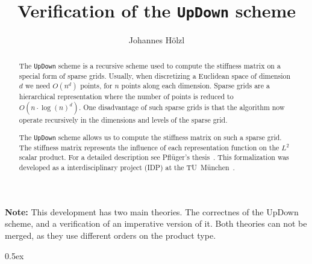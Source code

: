 \documentclass[11pt,a4paper]{article}
\title{Verification of the \texttt{UpDown} scheme}
\author{Johannes H{\"o}lzl}
\begin{document}
\maketitle

\begin{abstract}

The \texttt{UpDown} scheme is a recursive scheme used to compute the stiffness matrix on a special form of
sparse grids. Usually, when discretizing a Euclidean space of dimension $d$ we need $O(n^d)$ points,
for $n$ points along each dimension. Sparse grids are a hierarchical representation where the number
of points is reduced to $O(n\cdot\log(n)^d)$. One disadvantage of such sparse grids is that the
algorithm now operate recursively in the dimensions and levels of the sparse grid.

The \texttt{UpDown} scheme allows us to compute the stiffness matrix on such a sparse grid. The stiffness
matrix represents the influence of each representation function on the $L^2$ scalar product.
For a detailed description see Pfl{\"u}ger's thesis~\cite{pflueger10spatially}. This formalization
was developed as a interdisciplinary project (IDP) at the TU~M{\"u}nchen~\cite{hoelzl09updown}.

\end{abstract}

\textbf{Note:} This development has two main theories. The correctnes of the UpDown scheme, and
a verification of an imperative version of it. Both theories can not be merged, as they use
different orders on the product type.

\tableofcontents

\parindent 0pt\parskip 0.5ex





\end{document}
